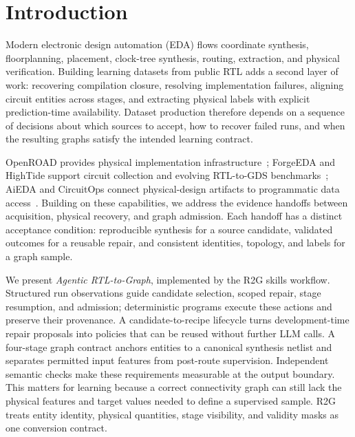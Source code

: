 \section{Introduction}
Modern electronic design automation (EDA) flows coordinate synthesis, floorplanning, placement, clock-tree synthesis, routing, extraction, and physical verification. Building learning datasets from public RTL adds a second layer of work: recovering compilation closure, resolving implementation failures, aligning circuit entities across stages, and extracting physical labels with explicit prediction-time availability. Dataset production therefore depends on a sequence of decisions about which sources to accept, how to recover failed runs, and when the resulting graphs satisfy the intended learning contract.

OpenROAD provides physical implementation infrastructure~\citep{openroad}; ForgeEDA and HighTide support circuit collection and evolving RTL-to-GDS benchmarks~\citep{forgeeda,hightide}; AiEDA and CircuitOps connect physical-design artifacts to programmatic data access~\citep{aieda,circuitops}. Building on these capabilities, we address the evidence handoffs between acquisition, physical recovery, and graph admission. Each handoff has a distinct acceptance condition: reproducible synthesis for a source candidate, validated outcomes for a reusable repair, and consistent identities, topology, and labels for a graph sample.

We present \emph{Agentic RTL-to-Graph}, implemented by the R2G skills workflow. Structured run observations guide candidate selection, scoped repair, stage resumption, and admission; deterministic programs execute these actions and preserve their provenance. A candidate-to-recipe lifecycle turns development-time repair proposals into policies that can be reused without further LLM calls. A four-stage graph contract anchors entities to a canonical synthesis netlist and separates permitted input features from post-route supervision. Independent semantic checks make these requirements measurable at the output boundary. This matters for learning because a correct connectivity graph can still lack the physical features and target values needed to define a supervised sample. R2G treats entity identity, physical quantities, stage visibility, and validity masks as one conversion contract.

